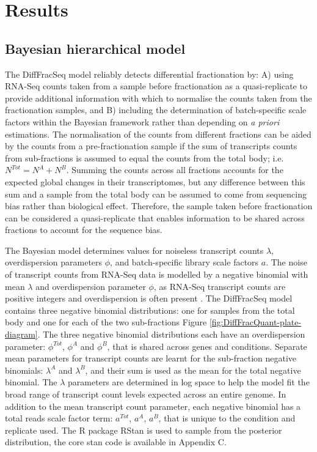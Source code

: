 \documentclass[../main.tex]{subfiles}
\begin{document}
\section{Results}

\subsection{Bayesian hierarchical model}

The DiffFracSeq model reliably detects differential fractionation by: A) using RNA-Seq counts taken from a sample before fractionation as a quasi-replicate to provide additional information with which to normalise the counts taken from the fractionation samples, and B) including the determination of batch-specific scale factors within the Bayesian framework rather than depending on \textit{a priori} estimations.
The normalisation of the counts from different fractions can be aided by the counts from a pre-fractionation sample if the sum of transcripts counts from sub-fractions is assumed to equal the counts from the total body; i.e. $N^{Tot} = N^{A}+N^{B}$.
Summing the counts across all fractions accounts for the expected global changes in their transcriptomes, but any difference between this sum and a sample from the total body can be assumed to come from sequencing bias rather than biological effect.
Therefore, the sample taken before fractionation can be considered a quasi-replicate that enables information to be shared across fractions to account for the sequence bias.

The Bayesian model determines values for noiseless transcript counts $\lambda$, overdispersion parameters $\phi$, and batch-specific library scale factors $a$.
The noise of transcript counts from RNA-Seq data is modelled by a negative binomial with mean $\lambda$ and overdispersion parameter $\phi$, as RNA-Seq transcript counts are positive integers and overdispersion is often present \parencite{Robinson2007,Cameron1998}.
The DiffFracSeq model contains three negative binomial distributions: one for samples from the total body and one for each of the two sub-fractions Figure \ref{fig:DiffFracQuant-plate-diagram}.
The three negative binomial distributions each have an overdispersion parameter: $\phi^{Tot}$, $\phi^{A}$ and $\phi^{B}$, that is shared across genes and conditions.
Separate mean parameters for transcript counts are learnt for the sub-fraction negative binomials: $\lambda^A$ and $\lambda^B$, and their sum is used as the mean for the total negative binomial.
The $\lambda$ parameters are determined in log space to help the model fit the broad range of transcript count levels expected across an entire genome.
In addition to the mean transcript count parameter, each negative binomial has a total reads scale factor term: $a^{Tot}$, $a^{A}$, $a^{B}$, that is unique to the condition and replicate used.
The R package RStan is used to sample from the posterior distribution, the core stan code is available in Appendix C.
\end{document}
